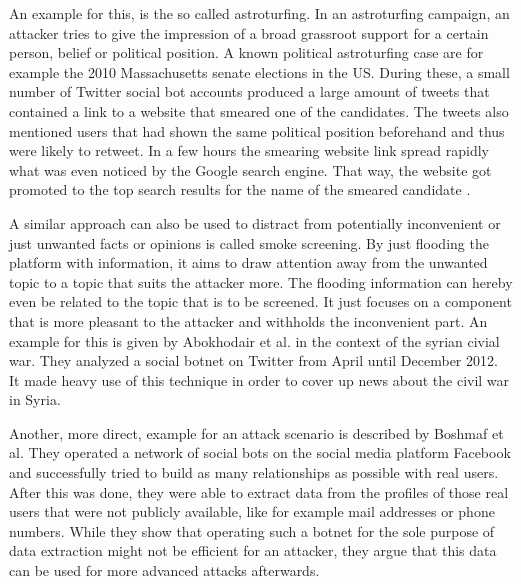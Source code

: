An example for this, is the so called astroturfing. In an astroturfing campaign, an attacker tries to give the impression of a broad grassroot support for a certain person, belief or political position. A known political astroturfing case are for example the 2010 Massachusetts senate elections in the US. During these, a small number of Twitter social bot accounts produced a large amount of tweets that contained a link to a website that smeared one of the candidates. The tweets also mentioned users that had shown the same political position beforehand and thus were likely to retweet. In a few hours the smearing website link spread rapidly what was even noticed by the Google search engine. That way, the website got promoted to the top search results for the name of the smeared candidate \cite{mustafaraj10}. 

A similar approach can also be used to distract from potentially inconvenient or just unwanted facts or opinions is called smoke screening. By just flooding the platform with information, it aims to draw attention away from the unwanted topic to a topic that suits the attacker more. The flooding information can hereby even be related to the topic that is to be screened. It just focuses on a component that is more pleasant to the attacker and withholds the inconvenient part. An example for this is given by Abokhodair et al. \cite{abokhodair} in the context of the syrian civial war. They analyzed a social botnet on Twitter from April until December 2012. It made heavy use of this technique in order to cover up news about the civil war in Syria.

Another, more direct, example for an attack scenario is described by Boshmaf et al. \cite{boshmaf13} They operated a network of social bots on the social media platform Facebook and successfully tried to build as many relationships as possible with real users. After this was done, they were able to extract data from the profiles of those real users that were not publicly available, like for example mail addresses or phone numbers. While they show that operating such a botnet for the sole purpose of data extraction might not be efficient for an attacker, they argue that this data can be used for more advanced attacks afterwards.

